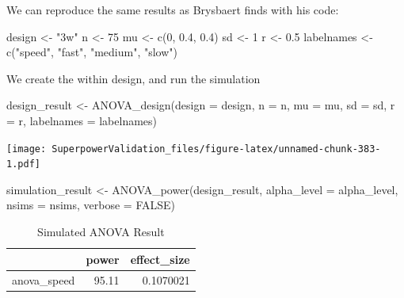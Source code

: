 \documentclass[
]{book}
\newenvironment{Shaded}{\begin{snugshade}}{\end{snugshade}}
\newcommand{\AttributeTok}[1]{\textcolor[rgb]{0.77,0.63,0.00}{#1}}
\newcommand{\ConstantTok}[1]{\textcolor[rgb]{0.00,0.00,0.00}{#1}}
\newcommand{\DecValTok}[1]{\textcolor[rgb]{0.00,0.00,0.81}{#1}}
\newcommand{\FloatTok}[1]{\textcolor[rgb]{0.00,0.00,0.81}{#1}}
\newcommand{\FunctionTok}[1]{\textcolor[rgb]{0.00,0.00,0.00}{#1}}
\newcommand{\NormalTok}[1]{#1}
\newcommand{\OtherTok}[1]{\textcolor[rgb]{0.56,0.35,0.01}{#1}}
\newcommand{\StringTok}[1]{\textcolor[rgb]{0.31,0.60,0.02}{#1}}
\begin{document}
We can reproduce the same results as Brysbaert finds with his code:

\begin{Shaded}
\begin{Highlighting}[]
\NormalTok{design }\OtherTok{\textless{}{-}} \StringTok{"3w"}
\NormalTok{n }\OtherTok{\textless{}{-}} \DecValTok{75}
\NormalTok{mu }\OtherTok{\textless{}{-}} \FunctionTok{c}\NormalTok{(}\DecValTok{0}\NormalTok{, }\FloatTok{0.4}\NormalTok{, }\FloatTok{0.4}\NormalTok{)}
\NormalTok{sd }\OtherTok{\textless{}{-}} \DecValTok{1}
\NormalTok{r }\OtherTok{\textless{}{-}} \FloatTok{0.5}
\NormalTok{labelnames }\OtherTok{\textless{}{-}} \FunctionTok{c}\NormalTok{(}\StringTok{"speed"}\NormalTok{, }\StringTok{"fast"}\NormalTok{, }\StringTok{"medium"}\NormalTok{, }\StringTok{"slow"}\NormalTok{)}
\end{Highlighting}
\end{Shaded}

We create the within design, and run the simulation

\begin{Shaded}
\begin{Highlighting}[]
\NormalTok{design\_result }\OtherTok{\textless{}{-}} \FunctionTok{ANOVA\_design}\NormalTok{(}\AttributeTok{design =}\NormalTok{ design,}
                   \AttributeTok{n =}\NormalTok{ n, }
                   \AttributeTok{mu =}\NormalTok{ mu, }
                   \AttributeTok{sd =}\NormalTok{ sd, }
                   \AttributeTok{r =}\NormalTok{ r, }
                   \AttributeTok{labelnames =}\NormalTok{ labelnames)}
\end{Highlighting}
\end{Shaded}

\texttt{[image: SuperpowerValidation\_files/figure-latex/unnamed-chunk-383-1.pdf]}

\begin{Shaded}
\begin{Highlighting}[]
\NormalTok{simulation\_result }\OtherTok{\textless{}{-}} \FunctionTok{ANOVA\_power}\NormalTok{(design\_result, }
                                 \AttributeTok{alpha\_level =}\NormalTok{ alpha\_level, }
                                 \AttributeTok{nsims =}\NormalTok{ nsims,}
                                 \AttributeTok{verbose =} \ConstantTok{FALSE}\NormalTok{)}
\end{Highlighting}
\end{Shaded}

\begin{table}[!h]

\caption{\label{tab:unnamed-chunk-385}Simulated ANOVA Result}
\centering
\begin{tabular}[t]{l|r|r}
\hline
  & power & effect\_size\\
\hline
anova\_speed & 95.11 & 0.1070021\\
\hline
\end{tabular}
\end{table}
\end{document}
